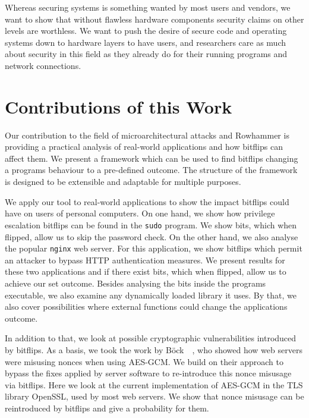 Whereas securing systems is something wanted by most users and vendors, we want
to show that without flawless hardware components security claims on other
levels are worthless. We want to push the desire of secure code and operating
systems down to hardware layers to have users, and researchers care as much
about security in this field as they already do for their running programs and
network connections.

\section{Contributions of this Work}

Our contribution to the field of microarchitectural attacks and Rowhammer is
providing a practical analysis of real-world applications and how bitflips can
affect them. We present a framework which can be used to find bitflips changing
a program\textquotesingle s behaviour to a pre-defined outcome. The structure of
the framework is designed to be extensible and adaptable for multiple purposes.

We apply our tool to real-world applications to show the impact bitflips could
have on users of personal computers. On one hand, we show how privilege
escalation bitflips can be found in the \texttt{sudo} program. We show bits,
which when flipped, allow us to skip the password check. On the other hand, we
also analyse the popular \texttt{nginx} web server. For this application, we
show bitflips which permit an attacker to bypass HTTP authentication measures.
We present results for these two applications and if there exist bits, which
when flipped, allow us to achieve our set outcome. Besides analysing the bits
inside the program\textquotesingle s executable, we also examine any dynamically
loaded library it uses. By that, we also cover possibilities where external
functions could change the application\textquotesingle s outcome.

In addition to that, we look at possible cryptographic vulnerabilities
introduced by bitflips. As a basis, we took the work by
Böck~\etal~\cite{gcmnonceattack}, who showed how web servers were misusing
nonces when using AES-GCM. We build on their approach to bypass the fixes
applied by server software to re-introduce this nonce misusage via bitflips.
Here we look at the current implementation of AES-GCM in the TLS library
OpenSSL, used by most web servers. We show that nonce misusage can be
reintroduced by bitflips and give a probability for them.

